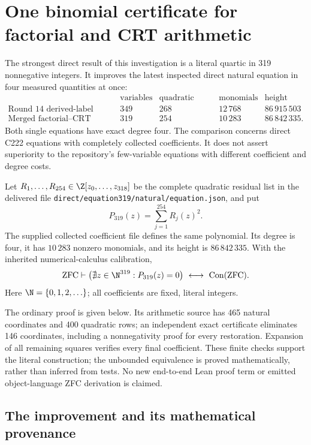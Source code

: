 \section{One binomial certificate for factorial and CRT arithmetic}
\label{sec:direct319}

The strongest direct result of this investigation is a literal quartic in
319 nonnegative integers. It improves the latest inspected direct natural
equation in four measured quantities at once:
\[
\begin{array}{lrrrr}
 &\text{variables}&\text{quadratic rows}&\text{monomials}&\text{height}\\
\text{Round 14 derived-label source}&349&268&12\,768&86\,915\,503\\
\text{Merged factorial--CRT source}&319&254&10\,283&86\,842\,335.
\end{array}
\]
Both single equations have exact degree four. The comparison concerns
direct C222 equations with completely collected coefficients. It does not
assert superiority to the repository's few-variable equations with different
coefficient and degree costs.

\begin{theorem}\label{thm:direct319}
Let $R_1,\ldots,R_{254}\in\Z[z_0,\ldots,z_{318}]$ be the complete quadratic
residual list in the delivered file
\texttt{direct/equation319/natural/equation.json}, and put
\[
             P_{319}(z)=\sum_{j=1}^{254}R_j(z)^2.
\]
The supplied collected coefficient file defines the same polynomial.
Its degree is four, it has $10\,283$ nonzero monomials, and its height is
$86\,842\,335$. With the inherited numerical-calculus calibration,
\[
 \mathrm{ZFC}\vdash
 \bigl(\nexists z\in\N^{319}:P_{319}(z)=0\bigr)
       \ \longleftrightarrow\ \operatorname{Con}(\mathrm{ZFC}).
\]
Here $\N=\{0,1,2,\ldots\}$; all coefficients are fixed, literal integers.
\end{theorem}

The ordinary proof is given below. Its arithmetic source has 465 natural
coordinates and 400 quadratic rows; an independent exact certificate
eliminates 146 coordinates, including a nonnegativity proof for every
restoration. Expansion of all remaining squares verifies every final
coefficient. These finite checks support the literal construction; the
unbounded equivalence is proved mathematically, rather than inferred from
tests. No new end-to-end Lean proof term or emitted object-language ZFC
derivation is claimed.

\subsection{The improvement and its mathematical provenance}

